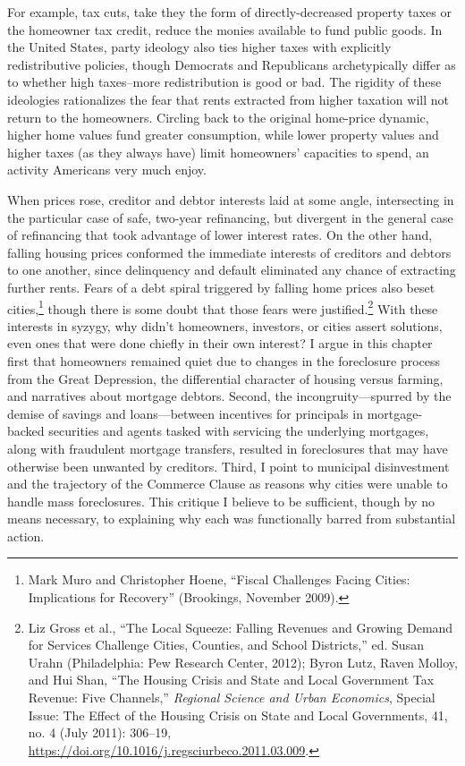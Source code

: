 \documentclass[12pt,oneside]{psthesis}
\begin{document}
For example, tax cuts, take they the form of directly-decreased property taxes or the homeowner tax credit, reduce the monies available to fund public goods.
In the United States, party ideology also ties higher taxes with explicitly redistributive policies, though Democrats and Republicans archetypically differ as to whether high taxes--more redistribution is good or bad.
The rigidity of these ideologies rationalizes the fear that rents extracted from higher taxation will not return to the homeowners.
Circling back to the original home-price dynamic, higher home values fund greater consumption, while lower property values and higher taxes (as they always have) limit homeowners' capacities to spend, an activity Americans very much enjoy.

When prices rose, creditor and debtor interests laid at some angle, intersecting in the particular case of safe, two-year refinancing, but divergent in the general case of refinancing that took advantage of lower interest rates.
On the other hand, falling housing prices conformed the immediate interests of creditors and debtors to one another, since delinquency and default eliminated any chance of extracting further rents.
Fears of a debt spiral triggered by falling home prices also beset cities,\footnote{Mark Muro and Christopher Hoene, ``Fiscal Challenges Facing Cities: Implications for Recovery'' (Brookings, November 2009).} though there is some doubt that those fears were justified.\footnote{Liz Gross et al., ``The Local Squeeze: Falling Revenues and Growing Demand for Services Challenge Cities, Counties, and School Districts,'' ed. Susan Urahn (Philadelphia: Pew Research Center, 2012); Byron Lutz, Raven Molloy, and Hui Shan, ``The Housing Crisis and State and Local Government Tax Revenue: Five Channels,'' \emph{Regional Science and Urban Economics}, Special Issue: The Effect of the Housing Crisis on State and Local Governments, 41, no. 4 (July 2011): 306--19, \url{https://doi.org/10.1016/j.regsciurbeco.2011.03.009}.}
With these interests in syzygy, why didn't homeowners, investors, or cities assert solutions, even ones that were done chiefly in their own interest?
I argue in this chapter first that homeowners remained quiet due to changes in the foreclosure process from the Great Depression, the differential character of housing versus farming, and narratives about mortgage debtors.
Second, the incongruity---spurred by the demise of savings and loans---between incentives for principals in mortgage-backed securities and agents tasked with servicing the underlying mortgages, along with fraudulent mortgage transfers, resulted in foreclosures that may have otherwise been unwanted by creditors.
Third, I point to municipal disinvestment and the trajectory of the Commerce Clause as reasons why cities were unable to handle mass foreclosures.
This critique I believe to be sufficient, though by no means necessary, to explaining why each was functionally barred from substantial action.
\end{document}
